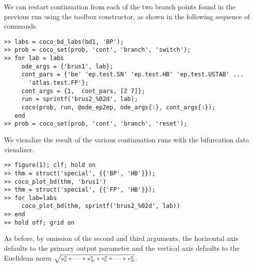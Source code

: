 We can restart continuation from each of the two branch points found in the previous run using the  toolbox constructor, as shown in the following sequence of commands.
\begin{lstlisting}[language=coco-highlight]
>> labs = coco_bd_labs(bd1, 'BP');
>> prob = coco_set(prob, 'cont', 'branch', 'switch');
>> for lab = labs
     ode_args = {'brus1', lab};
     cont_pars = {'be' 'ep.test.SN' 'ep.test.HB' 'ep.test.USTAB' ...
       'atlas.test.FP'};
     cont_args = {1,  cont_pars, [2 7]};
     run = sprintf('brus2_%02d', lab);
     coco(prob, run, @ode_ep2ep, ode_args{:}, cont_args{:});
   end
>> prob = coco_set(prob, 'cont', 'branch', 'reset');
\end{lstlisting}
We visualize the result of the various continuation runs with the  bifurcation data visualizer.
\begin{lstlisting}[language=coco-highlight]
>> figure(1); clf; hold on
>> thm = struct('special', {{'BP', 'HB'}});
>> coco_plot_bd(thm, 'brus1')
>> thm = struct('special', {{'FP', 'HB'}});
>> for lab=labs
     coco_plot_bd(thm, sprintf('brus2_%02d', lab))
>> end
>> hold off; grid on
\end{lstlisting}
As before, by omission of the second and third arguments, the horizontal axis defaults to the primary output parameter  and the vertical axis defaults to the Euclidean norm $\mbox{\scriptsize$\sqrt{u_0^2+\cdots+u_N^2+v_0^2+\cdots+v_N^2}$}$.

